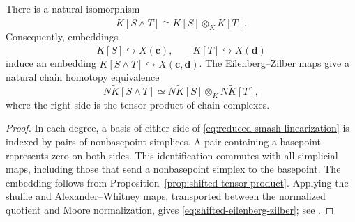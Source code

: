 \begin{proposition}
\label{prop:shifted-smash}
There is a natural isomorphism
\begin{equation}\label{eq:reduced-smash-linearization}
 \widetilde K[S\wedge T]
   \cong\widetilde K[S]\otimes_K\widetilde K[T].
\end{equation}
Consequently, embeddings
\[
 \widetilde K[S]\hookrightarrow X(\mathbf c),\qquad
 \widetilde K[T]\hookrightarrow X(\mathbf d)
\]
induce an embedding
$\widetilde K[S\wedge T]\hookrightarrow X(\mathbf c,\mathbf d)$.
The Eilenberg--Zilber maps give a natural chain homotopy equivalence
\begin{equation}\label{eq:shifted-eilenberg-zilber}
 N\widetilde K[S\wedge T]
   \simeq
 N\widetilde K[S]\otimes_K N\widetilde K[T],
\end{equation}
where the right side is the tensor product of chain complexes.
\end{proposition}

\begin{proof}
In each degree, a basis of either side of
\eqref{eq:reduced-smash-linearization} is indexed by pairs of
nonbasepoint simplices. A pair containing a basepoint represents zero
on both sides. This identification commutes with all simplicial maps,
including those that send a nonbasepoint simplex to the basepoint.
The embedding follows from Proposition~\ref{prop:shifted-tensor-product}.
Applying the shuffle and Alexander--Whitney maps, transported between
the normalized quotient and Moore normalization, gives
\eqref{eq:shifted-eilenberg-zilber}; see
\cite[\S8.5]{Weibel}.
\end{proof}

